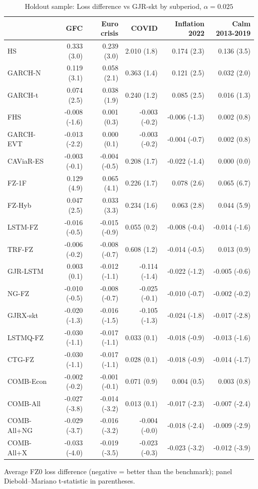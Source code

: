 \begin{table}[htbp]
\centering
\footnotesize
\caption{Holdout sample: Loss difference vs GJR-skt by subperiod, $\alpha=0.025$}
\label{tab:ho_sub}
\begin{tabular}{lrrrrr}
\toprule
 & GFC & Euro crisis & COVID & Inflation 2022 & Calm 2013-2019 \\
\midrule
HS & 0.333 (3.0) & 0.239 (3.0) & 2.010 (1.8) & 0.174 (2.3) & 0.136 (3.5) \\
GARCH-N & 0.119 (3.1) & 0.058 (2.1) & 0.363 (1.4) & 0.121 (2.5) & 0.032 (2.0) \\
GARCH-t & 0.074 (2.5) & 0.038 (1.9) & 0.240 (1.2) & 0.085 (2.5) & 0.016 (1.3) \\
FHS & -0.008 (-1.6) & 0.001 (0.3) & -0.003 (-0.2) & -0.006 (-1.3) & 0.002 (0.8) \\
GARCH-EVT & -0.013 (-2.2) & 0.000 (0.1) & -0.003 (-0.2) & -0.004 (-0.7) & 0.002 (0.8) \\
CAViaR-ES & -0.003 (-0.1) & -0.004 (-0.5) & 0.208 (1.7) & -0.022 (-1.4) & 0.000 (0.0) \\
FZ-1F & 0.129 (4.9) & 0.065 (4.1) & 0.226 (1.7) & 0.078 (2.6) & 0.065 (6.7) \\
FZ-Hyb & 0.047 (2.5) & 0.033 (3.3) & 0.234 (1.6) & 0.063 (2.8) & 0.044 (5.9) \\
LSTM-FZ & -0.016 (-0.5) & -0.015 (-0.9) & 0.055 (0.2) & -0.008 (-0.4) & -0.014 (-1.6) \\
TRF-FZ & -0.006 (-0.2) & -0.008 (-0.7) & 0.608 (1.2) & -0.014 (-0.5) & 0.013 (0.9) \\
GJR-LSTM & 0.003 (0.1) & -0.012 (-1.1) & -0.114 (-1.4) & -0.022 (-1.2) & -0.005 (-0.6) \\
NG-FZ & -0.010 (-0.5) & -0.008 (-0.7) & -0.025 (-0.1) & -0.010 (-0.7) & -0.002 (-0.2) \\
GJRX-skt & -0.020 (-1.3) & -0.016 (-1.5) & -0.105 (-1.3) & -0.024 (-1.8) & -0.017 (-2.8) \\
LSTMQ-FZ & -0.030 (-1.1) & -0.017 (-1.1) & 0.033 (0.1) & -0.018 (-0.9) & -0.013 (-1.6) \\
CTG-FZ & -0.030 (-1.1) & -0.017 (-1.1) & 0.028 (0.1) & -0.018 (-0.9) & -0.014 (-1.7) \\
COMB-Econ & -0.002 (-0.2) & -0.001 (-0.1) & 0.071 (0.9) & 0.004 (0.5) & 0.003 (0.8) \\
COMB-All & -0.027 (-3.8) & -0.014 (-3.2) & 0.013 (0.1) & -0.017 (-2.3) & -0.007 (-2.4) \\
COMB-All+NG & -0.029 (-3.7) & -0.016 (-3.2) & -0.004 (-0.0) & -0.018 (-2.4) & -0.009 (-2.9) \\
COMB-All+X & -0.033 (-4.0) & -0.019 (-3.5) & -0.023 (-0.3) & -0.023 (-3.2) & -0.012 (-3.9) \\
\bottomrule
\end{tabular}
\par\smallskip\parbox{\linewidth}{\scriptsize Average FZ0 loss difference (negative = better than the benchmark); panel Diebold--Mariano t-statistic in parentheses.}
\end{table}